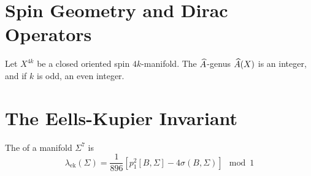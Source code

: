 
\section{Spin Geometry and Dirac Operators}

\begin{theorem}
	Let $X^{4k}$ be a closed oriented spin $4k$-manifold. The $\widehat{A}$-genus $\widehat{A}(X)$ is an integer, and if $k$ is odd, an even integer.
\end{theorem}

\section{The Eells-Kupier Invariant}\label{sec:eells-kupier_invariant}

\begin{definition}
	The  of a manifold $\Sigma^7$ is
	\[
		\boxed{
		\lambda_{\mathrm{ek}}(\Sigma) = \frac{1}{896}\left[p_1^2[B, \Sigma] - 4\sigma(B,\Sigma)\right] \mod 1}
	\]
\end{definition}
